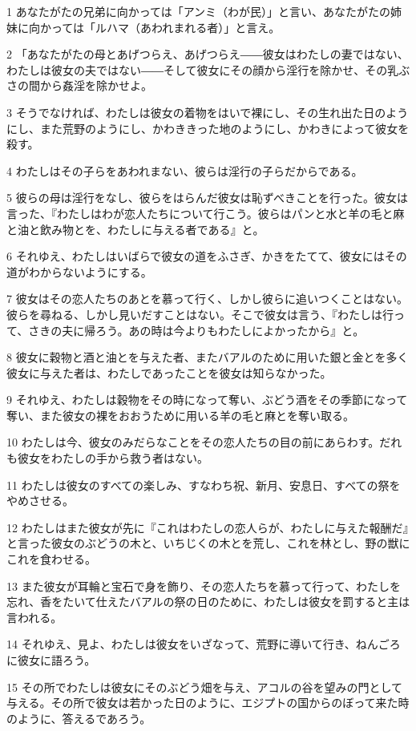 \par 1 あなたがたの兄弟に向かっては「アンミ（わが民）」と言い、あなたがたの姉妹に向かっては「ルハマ（あわれまれる者）」と言え。
\par 2 「あなたがたの母とあげつらえ、あげつらえ――彼女はわたしの妻ではない、わたしは彼女の夫ではない――そして彼女にその顔から淫行を除かせ、その乳ぶさの間から姦淫を除かせよ。
\par 3 そうでなければ、わたしは彼女の着物をはいで裸にし、その生れ出た日のようにし、また荒野のようにし、かわききった地のようにし、かわきによって彼女を殺す。
\par 4 わたしはその子らをあわれまない、彼らは淫行の子らだからである。
\par 5 彼らの母は淫行をなし、彼らをはらんだ彼女は恥ずべきことを行った。彼女は言った、『わたしはわが恋人たちについて行こう。彼らはパンと水と羊の毛と麻と油と飲み物とを、わたしに与える者である』と。
\par 6 それゆえ、わたしはいばらで彼女の道をふさぎ、かきをたてて、彼女にはその道がわからないようにする。
\par 7 彼女はその恋人たちのあとを慕って行く、しかし彼らに追いつくことはない。彼らを尋ねる、しかし見いだすことはない。そこで彼女は言う、『わたしは行って、さきの夫に帰ろう。あの時は今よりもわたしによかったから』と。
\par 8 彼女に穀物と酒と油とを与えた者、またバアルのために用いた銀と金とを多く彼女に与えた者は、わたしであったことを彼女は知らなかった。
\par 9 それゆえ、わたしは穀物をその時になって奪い、ぶどう酒をその季節になって奪い、また彼女の裸をおおうために用いる羊の毛と麻とを奪い取る。
\par 10 わたしは今、彼女のみだらなことをその恋人たちの目の前にあらわす。だれも彼女をわたしの手から救う者はない。
\par 11 わたしは彼女のすべての楽しみ、すなわち祝、新月、安息日、すべての祭をやめさせる。
\par 12 わたしはまた彼女が先に『これはわたしの恋人らが、わたしに与えた報酬だ』と言った彼女のぶどうの木と、いちじくの木とを荒し、これを林とし、野の獣にこれを食わせる。
\par 13 また彼女が耳輪と宝石で身を飾り、その恋人たちを慕って行って、わたしを忘れ、香をたいて仕えたバアルの祭の日のために、わたしは彼女を罰すると主は言われる。
\par 14 それゆえ、見よ、わたしは彼女をいざなって、荒野に導いて行き、ねんごろに彼女に語ろう。
\par 15 その所でわたしは彼女にそのぶどう畑を与え、アコルの谷を望みの門として与える。その所で彼女は若かった日のように、エジプトの国からのぼって来た時のように、答えるであろう。
